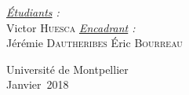 \begin{titlepage}
\begin{center}
\noindent
\begin{minipage}{0.9\textwidth}
  \begin{flushleft} \large
    \emph{\underline{Étudiants} :}\\
    
    
    Victor \textsc{Huesca}
    \hfill
    \emph{\underline{Encadrant} :} \\
    
    Jérémie \textsc{Dautheribes}
    \hfill
    Éric \textsc{Bourreau}
  \end{flushleft}
\end{minipage}



\vfill

{\Large Université de Montpellier}\\[0.4cm]
{\Large Janvier~2018}



\end{center}
\end{titlepage}